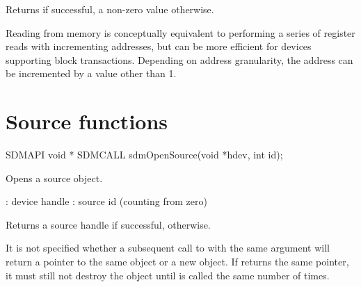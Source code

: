 \documentclass[a4paper,12pt,twoside,extrafontsizes]{memoir}
\begin{document}
\begin{funcret}
	Returns  if successful, a non-zero value otherwise.
\end{funcret}

\begin{funcremarks}
	Reading from memory is conceptually equivalent to performing a series of register reads with incrementing addresses, but can be more efficient for devices supporting block transactions. Depending on address granularity, the address can be incremented by a value other than 1.
\end{funcremarks}

\section{Source functions}
\label{sec:sourcefunctions}



\begin{cfuncprototype}
SDMAPI void * SDMCALL sdmOpenSource(void *hdev, int id);
\end{cfuncprototype}

\begin{funcdescr}
	Opens a source object.
\end{funcdescr}

\begin{funcparams}
	: device handle
	: source id (counting from zero)
\end{funcparams}

\begin{funcret}
	Returns a source handle if successful,  otherwise.
\end{funcret}

\begin{funcremarks}
	It is not specified whether a subsequent call to  with the same  argument will return a pointer to the same object or a new object. If  returns the same pointer, it must still not destroy the object until  is called the same number of times.
\end{funcremarks}


\end{document}
